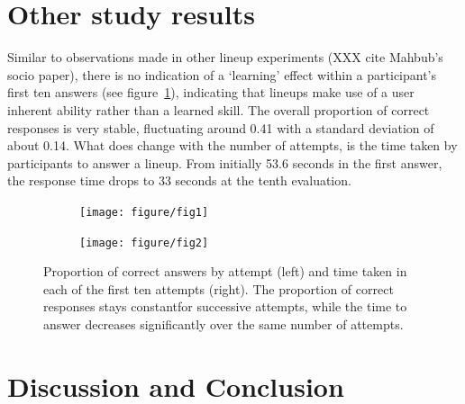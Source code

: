 \documentclass{article}\usepackage[]{graphicx}\usepackage[]{color}
\newenvironment{knitrout}{}{} %
\begin{document}
\section{Other study results}



Similar to observations made in other lineup experiments (XXX cite Mahbub's socio paper), there is no indication of a `learning' effect within a participant's first ten answers (see figure~\ref{fig:attempts}), indicating that lineups make use of a user inherent ability rather than a learned skill. The overall proportion of correct responses is very stable, fluctuating around 0.41 with a standard deviation of about 0.14.  What does change with the number of attempts, is the time taken by participants to answer a lineup. From initially 53.6 seconds in the first answer, the response time drops to 33 seconds at the tenth evaluation.
\begin{figure}
\centering
\begin{subfigure}[b]{.3\textwidth}
\begin{knitrout}
\color{fgcolor}
\texttt{[image: figure/fig1]} 

\end{knitrout}

\end{subfigure}
\begin{subfigure}[b]{.3\textwidth}
\begin{knitrout}
\color{fgcolor}
\texttt{[image: figure/fig2]} 

\end{knitrout}

\end{subfigure}
\caption{\label{fig:attempts}Proportion of correct answers by attempt (left) and time taken in each of the first ten attempts (right). The proportion of correct responses stays constantfor successive attempts, while the time to answer decreases significantly over the same number of attempts.}
\end{figure}

\section{Discussion and Conclusion}
\end{document}
